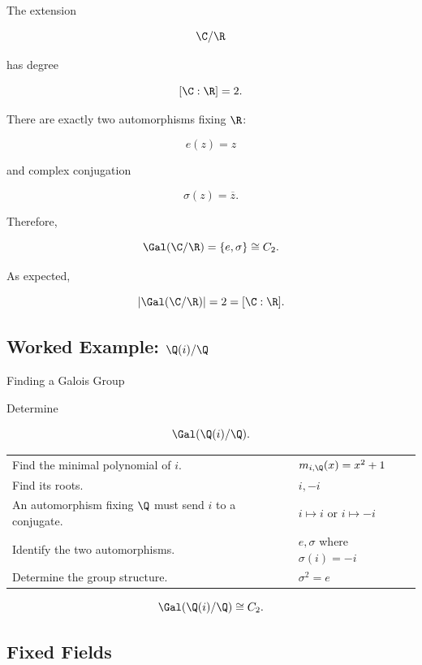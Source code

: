 The extension

\[ \C/\R \]

has degree

\[ [\C:\R]=2. \]

There are exactly two automorphisms fixing \(\R\):

\[ e(z)=z \]

and complex conjugation

\[ \sigma(z)=\overline z. \]

Therefore,

\[ \Gal(\C/\R)=\{e,\sigma\}\cong C_2. \]

As expected,

\[ |\Gal(\C/\R)|=2=[\C:\R]. \]

\subsection{Worked Example: \(\Q(i)/\Q\)}
\label{subsec:worked-galois-qi}

\begin{workedexamplebox}{Finding a Galois Group}

Determine

\[ \Gal(\Q(i)/\Q). \]

\begin{tabularx}{\textwidth}{@{}>{\raggedright\arraybackslash}p{}X@{}}
Find the minimal polynomial of \(i\). & \(m_{i,\Q}(x)=x^2+1\)\\
Find its roots. & \(i,-i\)\\
An automorphism fixing \(\Q\) must send \(i\) to a conjugate. & \(i\mapsto i\) or \(i\mapsto-i\)\\
Identify the two automorphisms. & \(e,\sigma\) where \(\sigma(i)=-i\)\\
Determine the group structure. & \(\sigma^2=e\)
\end{tabularx}

\begin{answerbox}
\[ \Gal(\Q(i)/\Q)\cong C_2. \]
\end{answerbox}
\end{workedexamplebox}

\subsection{Fixed Fields}
\label{subsec:fixed-fields}

